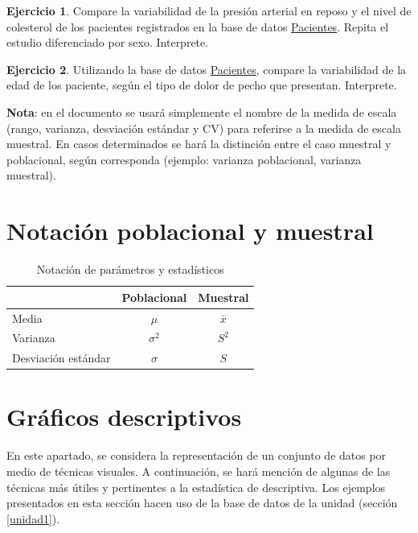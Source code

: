 \documentclass[
  11pt,
]{book}
\theoremstyle{definition}
\theoremstyle{definition}
\theoremstyle{definition}
\newtheorem{exercise}{Ejercicio}[chapter]
\theoremstyle{definition}
\theoremstyle{remark}
\begin{document}
\begin{exercise}
Compare la variabilidad de la presión arterial en reposo y el nivel de colesterol de los pacientes registrados en la base de datos \hyperref[Pacientes]{Pacientes}. Repita el estudio diferenciado por sexo. Interprete.
\end{exercise}

\begin{exercise}
Utilizando la base de datos \hyperref[Pacientes]{Pacientes}, compare la variabilidad de la edad de los paciente, según el tipo de dolor de pecho que presentan. Interprete.
\end{exercise}

\textbf{Nota}: en el documento se usará simplemente el nombre de la medida de escala (rango, varianza, desviación estándar y CV) para referirse a la medida de escala muestral. En casos determinados se hará la distinción entre el caso muestral y poblacional, según corresponda (ejemplo: varianza poblacional, varianza muestral).

\section{Notación poblacional y muestral}\label{topicos-notacion}

\begin{table}[H]
\centering
\caption{\label{tab:notacion}Notación de parámetros y estadísticos}
\centering
\begin{tabular}[t]{lcc}
\toprule
  & Poblacional & Muestral\\
\midrule
Media & $\mu$ & $\bar{x}$\\
Varianza & $\sigma^2$ & $S^2$\\
Desviación estándar & $\sigma$ & $S$\\
\bottomrule
\end{tabular}
\end{table}

\section{Gráficos descriptivos}\label{topicos-graficos}

En este apartado, se considera la representación de un conjunto de datos por medio de técnicas visuales. A continuación, se hará mención de algunas de las técnicas más útiles y pertinentes a la estadística de descriptiva. Los ejemplos presentados en esta sección hacen uso de la base de datos de la unidad (sección \ref{unidad1}).
\end{document}
